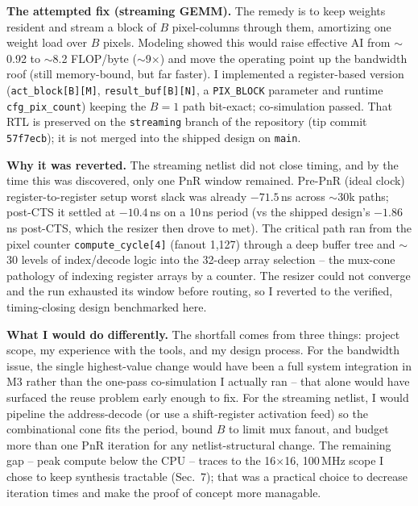 \documentclass[11pt]{article}
\begin{document}
\textbf{The attempted fix (streaming GEMM).} The remedy is to keep weights
resident and stream a block of \(B\) pixel-columns through them, amortizing one
weight load over \(B\) pixels. Modeling showed this would raise effective AI
from \(\sim\)0.92 to \(\sim\)8.2 FLOP/byte (\(\sim\)9$\times$) and move the
operating point up the bandwidth roof (still memory-bound, but far faster). I
implemented a register-based version (\texttt{act\_block[B][M]},
\texttt{result\_buf[B][N]}, a \texttt{PIX\_BLOCK} parameter and runtime
\texttt{cfg\_pix\_count}) keeping the \(B{=}1\) path bit-exact; co-simulation
passed. That RTL is preserved on the \texttt{streaming} branch of the
repository (tip commit \texttt{57f7ecb}); it is not merged into the shipped
design on \texttt{main}.

\textbf{Why it was reverted.} The streaming netlist did not close timing, and 
by the time this was discovered, only one PnR window remained.
Pre-PnR (ideal clock) register-to-register setup
worst slack was already \(-71.5\)\,ns across \(\sim\)30k paths; post-CTS it
settled at \(-10.4\)\,ns on a 10\,ns period (vs the shipped design's
\(-1.86\)\,ns post-CTS, which the resizer then drove to met). The critical path
ran from the pixel counter \texttt{compute\_cycle[4]} (fanout 1{,}127) through a
deep buffer tree and \(\sim\)30 levels of index/decode logic into the 32-deep
array selection -- the mux-cone pathology of indexing register arrays by a
counter. The resizer could not converge and the run exhausted its window before
routing, so I reverted to the verified, timing-closing design benchmarked here.

\textbf{What I would do differently.} The shortfall comes from three things:
project scope, my experience with the tools, and my design process. For the
bandwidth issue, the single highest-value change would have been a full system
integration in M3 rather than the one-pass co-simulation I actually ran -- that
alone would have surfaced the reuse problem early enough to fix. For the
streaming netlist, I would pipeline the address-decode (or use a shift-register
activation feed) so the combinational cone fits the period, bound \(B\) to limit
mux fanout, and budget more than one PnR iteration for any netlist-structural
change. The remaining gap -- peak compute below the CPU -- traces to the
16$\times$16, 100\,MHz scope I chose to keep synthesis tractable (Sec.~7); that
was a practical choice to decrease iteration times and make the proof of concept more managable.

\end{document}
